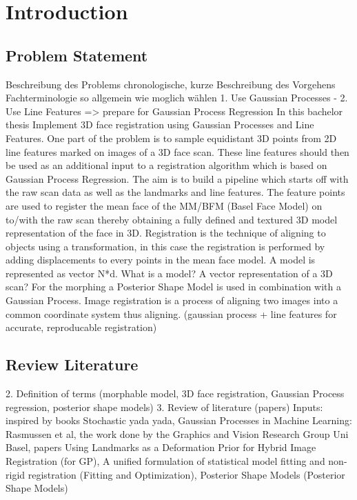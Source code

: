 \chapter{Introduction}
\section{Problem Statement}
Beschreibung des Problems
chronologische, kurze Beschreibung des Vorgehens
Fachterminologie so allgemein wie moglich wählen
1. Use Gaussian Processes - 2. Use Line Features => prepare for Gaussian Process Regression
In this bachelor thesis 
Implement 3D face registration using Gaussian Processes and Line Features. One part of the problem is to sample equidistant 3D points from 2D line features marked on images of a 3D face scan. These line features should then be used as an additional input to a registration algorithm which is based on Gaussian Process Regression. The aim is to build a pipeline which starts off with the raw scan data as well as the landmarks and line features. The feature points are used to register the mean face of the MM/BFM (Basel Face Model) on to/with the raw scan thereby obtaining a fully defined and textured 3D model representation of the face in 3D. Registration is the technique of aligning to objects using a transformation, in this case the registration is performed by adding displacements to every points in the mean face model.
A model is represented as vector N*d. What is a model? A vector representation of a 3D scan?
For the morphing a Posterior Shape Model is used in combination with a Gaussian Process.
Image registration is a process of aligning two images into a common coordinate system 
thus aligning.
(gaussian process + line features for accurate, reproducable registration)
\section{Review Literature}
	2. Definition of terms (morphable model, 3D face registration, Gaussian Process regression, posterior shape models)
	3. Review of literature (papers)
    Inputs: inspired by books Stochastic yada yada, Gaussian Processes in Machine Learning: Rasmussen et al, the work done by the Graphics and Vision Research Group Uni Basel, papers 
    Using Landmarks as a Deformation Prior for Hybrid Image Registration (for GP), A unified formulation of statistical model fitting and non-rigid registration (Fitting and Optimization),
Posterior Shape Models (Posterior Shape Models)


